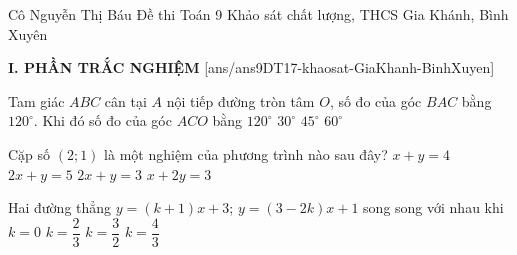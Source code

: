 
\begin{name}
{Cô Nguyễn Thị Báu}
{Đề thi Toán 9 Khảo sát chất lượng, THCS Gia Khánh, Bình Xuyên}
\end{name}
\noindent\textbf{I. PHẦN TRẮC NGHIỆM}
\setcounter{ex}{0}
[ans/ans9DT17-khaosat-GiaKhanh-BinhXuyen]
\begin{ex}%
  Tam giác $ABC$ cân tại $A$  nội tiếp đường tròn tâm $O$, số đo của góc $BAC$ bằng $120^\circ$. Khi đó số đo của góc $ACO$ bằng
	\choice
	{$120^\circ$}
	{$30^\circ$}
	{$45^\circ$}
	{\True $60^\circ$}
\end{ex}

\begin{ex}%
  	Cặp số $\left(2; 1\right)$ là một nghiệm của phương trình nào sau đây?
	\choice
	{$x + y = 4$}
	{\True $2x + y = 5$}
	{$2x + y = 3$}
	{$x + 2y = 3$}
\end{ex}

\begin{ex}%
	Hai đường thẳng $y = (k+1)x + 3$; $y = (3 - 2k)x + 1$ song song với nhau khi
	\choice
	{$k = 0$}
	{\True $k = \dfrac{2}{3}$}
	{$k = \dfrac{3}{2}$}
	{$k = \dfrac{4}{3}$}
\end{ex}

